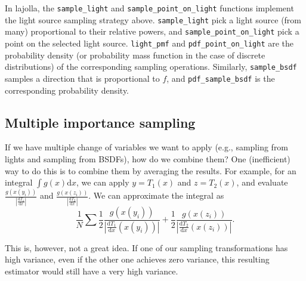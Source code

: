 In lajolla, the \lstinline{sample_light} and \lstinline{sample_point_on_light} functions implement the light source sampling strategy above. \lstinline{sample_light} pick a light source (from many) proportional to their relative powers, and \lstinline{sample_point_on_light} pick a point on the selected light source. \lstinline{light_pmf} and \lstinline{pdf_point_on_light} are the probability density (or probability mass function in the case of discrete distributions) of the corresponding sampling operations. Similarly, \lstinline{sample_bsdf} samples a direction that is proportional to $f$, and \lstinline{pdf_sample_bsdf} is the corresponding probability density.

\subsection{Multiple importance sampling}

If we have multiple change of variables we want to apply (e.g., sampling from lights and sampling from BSDFs), how do we combine them? One (inefficient) way to do this is to combine them by averaging the results. For example, for an integral $\int g(x) \mathrm{d}x$, we can apply $y = T_1(x)$ and $z = T_2(x)$, and evaluate $\frac{g(x(y_i))}{\left|
\frac{\mathrm{d}T_1}{\mathrm{d}x}\right|}$ and $\frac{g(x(z_i))}{\left|\frac{\mathrm{d}T_2}{\mathrm{d}x}\right|}$. We can approximate the integral as
\begin{equation}
\frac{1}{N} \sum
\frac{1}{2} \frac{g(x(y_i))}{\left|\frac{\mathrm{d}T_1}{\mathrm{d}x}(x(y_i))\right|} + 
\frac{1}{2} \frac{g(x(z_i))}{\left|\frac{\mathrm{d}T_2}{\mathrm{d}x}(x(z_i))\right|}.
\end{equation}

This is, however, not a great idea. If one of our sampling transformations has high variance, even if the other one achieves zero variance, this resulting estimator would still have a very high variance.

